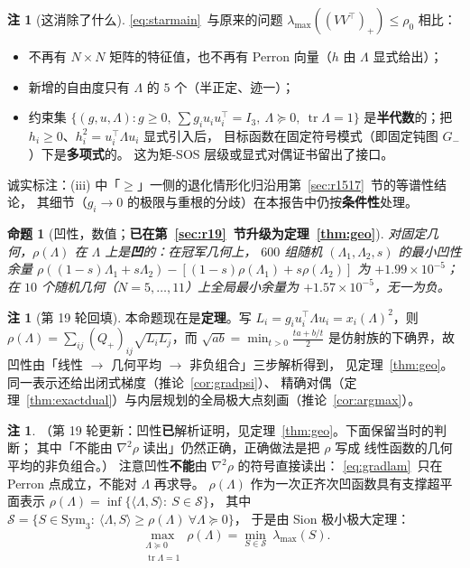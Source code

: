 \documentclass[UTF8,11pt]{ctexart}
\newtheorem{proposition}[theorem]{命题}
\theoremstyle{definition}
\newtheorem{remark}[theorem]{注}
\newcommand{\Lam}{\Lambda}
\newcommand{\tr}{\operatorname{tr}}
\begin{document}
\begin{remark}[这消除了什么]\label{rmk:lamparamread}
\eqref{eq:starmain}~与原来的问题 $\lambda_{\max}((VV^\top)_+)\le\rho_0$ 相比：
\begin{itemize}\itemsep2pt
\item 不再有 $N\times N$ 矩阵的特征值，也不再有 Perron 向量（$h$ 由 $\Lam$ 显式给出）；
\item 新增的自由度只有 $\Lam$ 的 $5$ 个（半正定、迹一）；
\item 约束集 $\{(g,u,\Lam): g\ge0,\ \sum g_iu_iu_i^\top=I_3,\ \Lam\succeq0,\ \tr\Lam=1\}$
是\textbf{半代数}的；把 $h_i\ge0$、$h_i^2=u_i^\top\Lam u_i$ 显式引入后，
目标函数在固定符号模式（即固定钝图 $G_-$）下是\textbf{多项式}的。
这为矩-SOS 层级或显式对偶证书留出了接口。
\end{itemize}
诚实标注：(iii) 中「$\ge$」一侧的退化情形化归沿用第~\ref{sec:r1517}~节的等谱性结论，
其细节（$g_i\to0$ 的极限与重根的分歧）在本报告中仍按\textbf{条件性}处理。
\end{remark}

\begin{proposition}[凹性，数值；\textbf{已在第~\ref{sec:r19}~节升级为定理~\ref{thm:geo}}]\label{prop:concave}
对固定几何，$\rho(\Lam)$ 在 $\Lam$ 上是\textbf{凹}的：在冠军几何上，
$600$ 组随机 $(\Lam_1,\Lam_2,s)$ 的最小凹性余量
$\rho((1-s)\Lam_1+s\Lam_2)-[(1-s)\rho(\Lam_1)+s\rho(\Lam_2)]$ 为 $+1.99\times10^{-5}$；
在 $10$ 个随机几何（$N=5,\dots,11$）上全局最小余量为 $+1.57\times10^{-5}$，无一为负。
\end{proposition}

\begin{remark}[第 19 轮回填]\label{rmk:concavefill}
本命题现在是\textbf{定理}。写 $L_i=g_iu_i^\top\Lam u_i=x_i(\Lam)^2$，则
$\rho(\Lam)=\sum_{ij}(Q_+)_{ij}\sqrt{L_iL_j}$，而 $\sqrt{ab}=\min_{t>0}\frac{ta+b/t}2$
是仿射族的下确界，故凹性由「线性 $\to$ 几何平均 $\to$ 非负组合」三步解析得到，
见定理~\ref{thm:geo}。同一表示还给出闭式梯度（推论~\ref{cor:gradpsi}）、
精确对偶（定理~\ref{thm:exactdual}）与内层规划的全局极大点刻画（推论~\ref{cor:argmax}）。
\end{remark}

\begin{remark}\label{rmk:concave}
（第 19 轮更新：凹性\textbf{已}解析证明，见定理~\ref{thm:geo}。下面保留当时的判断；
其中「不能由 $\nabla^2\rho$ 读出」仍然正确，正确做法是把 $\rho$ 写成
线性函数的几何平均的非负组合。）
注意凹性\textbf{不能}由 $\nabla^2\rho$ 的符号直接读出：
\eqref{eq:gradlam}~只在 Perron 点成立，不能对 $\Lam$ 再求导。
$\rho(\Lam)$ 作为一次正齐次凹函数具有支撑超平面表示
$\rho(\Lam)=\inf\{\langle\Lam,S\rangle:\ S\in\mathcal S\}$，
其中 $\mathcal S=\{S\in\mathrm{Sym}_3:\ \langle\Lam,S\rangle\ge\rho(\Lam)\ \forall\Lam\succeq0\}$，
于是由 Sion 极小极大定理：
\begin{equation}\label{eq:dualcert}
\max_{\substack{\Lam\succeq0\\\tr\Lam=1}}\rho(\Lam)=\min_{S\in\mathcal S}\ \lambda_{\max}(S).
\end{equation}
\end{remark}
\end{document}
